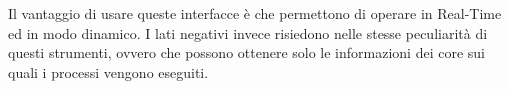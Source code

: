 Il vantaggio di usare queste interfacce è che permettono di operare in \gls{Real-Time} ed in modo dinamico. I lati negativi invece risiedono nelle stesse peculiarità di questi strumenti, ovvero che possono ottenere solo le informazioni dei core sui quali i processi vengono eseguiti. 




